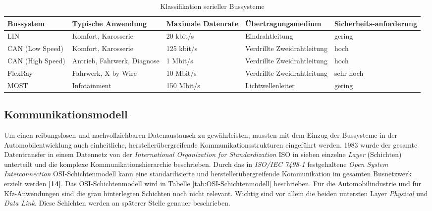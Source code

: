 \begin{table}[!htbp]
	\centering
	\caption{Klassifikation serieller Bussysteme}
	\renewcommand{\arraystretch}{1.3}
	\begin{tabulary}{\columnwidth}{L L L L L}
		\toprule
		Bussystem        & Typische Anwendung           & Maximale Datenrate & Übertragungsmedium          & Sicherheits-anforderung \\ \midrule
		LIN              & Komfort, Karosserie          & 20 kbit/s          & Eindrahtleitung             & gering                  \\
		CAN (Low Speed)  & Komfort, Karosserie          & 125 kbit/s         & Verdrillte Zweidrahtleitung & hoch                    \\
		CAN (High Speed) & Antrieb, Fahrwerk, Diagnose  & 1 Mbit/s           & Verdrillte Zweidrahtleitung & hoch                    \\
		FlexRay          & Fahrwerk, \newline X by Wire & 10 Mbit/s          & Verdrillte Zweidrahtleitung & sehr hoch               \\
		MOST             & Infotainment                 & 150 Mbit/s         & Lichtwellenleiter           & gering                  \\ \bottomrule
	\end{tabulary}

	\label{tab:KlassifikationSerielleBussysteme}
\end{table}



\subsection{Kommunikationsmodell} \label{subsec:Kommunikationsmodell}
Um einen reibungslosen und nachvollziehbaren Datenaustausch zu gewährleisten, mussten mit dem Einzug der Bussysteme in der Automobilentwicklung auch einheitliche, herstellerübergreifende Kommunikationsstrukturen eingeführt werden. 1983 wurde der gesamte Datentransfer in einem Datennetz von der \emph{International Organization for Standardization} \acs{ISO} in sieben einzelne \emph{Layer} (Schichten) unterteilt und die komplexe Kommunikationshierarchie beschrieben. Durch das in \emph{ISO/IEC 7498-1} festgehaltene \emph{Open System Interconnection} \acs{OSI}-Schichtenmodell kann eine standardisierte und herstellerübergreifende Kommunikation im gesamten Busnetzwerk erzielt werden \textbf{[14]}. Das OSI-Schichtenmodell wird in Tabelle \ref{tab:OSI-Schichtenmodell} beschrieben. Für die Automobilindustrie und für Kfz-Anwendungen sind die grau hinterlegten Schichten noch nicht relevant. Wichtig sind vor allem die beiden untersten Layer \emph{Physical} und \emph{Data Link}. Diese Schichten werden an späterer Stelle genauer beschrieben. 


